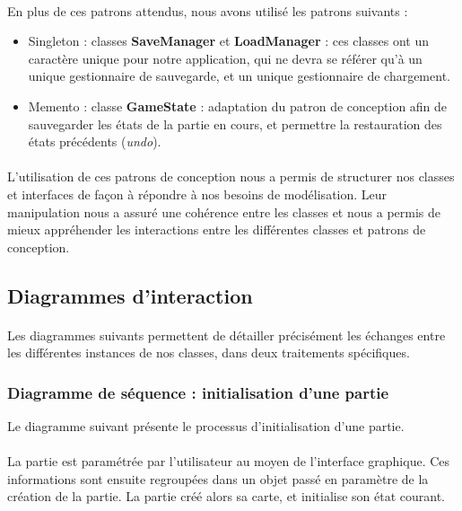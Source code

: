 \documentclass[a4paper]{article}
\begin{document}
\paragraph{}
En plus de ces patrons attendus, nous avons utilisé les patrons suivants :
\begin{itemize}
    \item Singleton : classes \textbf{SaveManager} et \textbf{LoadManager} : ces classes ont un caractère unique pour notre application, qui ne devra se référer qu'à un unique gestionnaire de sauvegarde, et un unique gestionnaire de chargement.
    \item Memento : classe \textbf{GameState} : adaptation du patron de conception afin de sauvegarder les états de la partie en cours, et permettre la restauration des états précédents (\textit{undo}).
\end{itemize}

\paragraph{}
L'utilisation de ces patrons de conception nous a permis de structurer nos classes et interfaces de façon à répondre à nos besoins de modélisation. Leur manipulation nous a assuré une cohérence entre les classes et nous a permis de mieux appréhender les interactions entre les différentes classes et patrons de conception.



\subsection{Diagrammes d'interaction}
\paragraph{}
Les diagrammes suivants permettent de détailler précisément les échanges entre les différentes instances de nos classes, dans deux traitements spécifiques.

\subsubsection{Diagramme de séquence : initialisation d'une partie}
Le diagramme suivant présente le processus d'initialisation d'une partie.

\paragraph{}
La partie est paramétrée par l'utilisateur au moyen de l'interface graphique. Ces informations sont ensuite regroupées dans un objet passé en paramètre de la création de la partie. La partie créé alors sa carte, et initialise son état courant.
\end{document}
